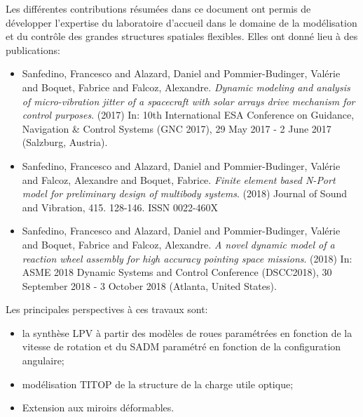 Les différentes contributions résumées dans ce document ont permis de développer l'expertise du laboratoire d'accueil dans le domaine de la modélisation et du contrôle des grandes structures spatiales flexibles. Elles ont donné lieu à des publications:
\begin{itemize}
\item Sanfedino, Francesco and Alazard, Daniel and Pommier-Budinger, Valérie and Boquet, Fabrice and Falcoz, Alexandre. \textit{Dynamic modeling and analysis of micro-vibration jitter of a spacecraft with solar arrays drive mechanism for control purposes}. (2017) In: 10th International ESA Conference on Guidance, Navigation \& Control Systems (GNC 2017), 29 May 2017 - 2 June 2017 (Salzburg, Austria).
\item Sanfedino, Francesco and Alazard, Daniel and Pommier-Budinger, Valérie and Falcoz, Alexandre and Boquet, Fabrice. \textit{Finite element based N-Port model for preliminary design of multibody systems}. (2018) Journal of Sound and Vibration, 415. 128-146. ISSN 0022-460X
\item Sanfedino, Francesco and Alazard, Daniel and Pommier-Budinger, Valérie and Boquet, Fabrice and Falcoz, Alexandre. \textit{A novel dynamic model of a reaction wheel assembly for high accuracy pointing space missions}. (2018) In: ASME 2018 Dynamic Systems and Control Conference (DSCC2018), 30 September 2018 - 3 October 2018 (Atlanta, United States). 
\end{itemize}
Les principales perspectives à ces travaux sont:
\begin{itemize}
\item la synthèse LPV à partir des modèles de roues paramétrées en fonction de la vitesse de rotation et du SADM paramétré en fonction de la configuration angulaire;
\item modélisation TITOP de la structure de la charge utile optique;
\item Extension aux miroirs déformables.
\end{itemize}
